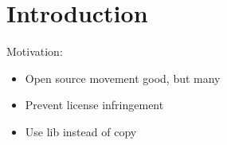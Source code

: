 
\chapter{Introduction}\label{chapter:introduction}
Motivation:
\begin{itemize}
    \item Open source movement good, but many 
    \item Prevent license infringement
    \item Use lib instead of copy
\end{itemize}
